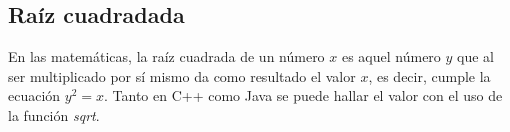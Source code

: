 \subsection{Raíz cuadradada}
En las matemáticas, la raíz cuadrada de un número $x$ es aquel número $y$ que al ser multiplicado por sí mismo da como resultado el valor $x$, es decir, cumple la ecuación $y^2 = x$. Tanto en C++ como Java se puede hallar el valor con el uso de la función \emph{sqrt}. 